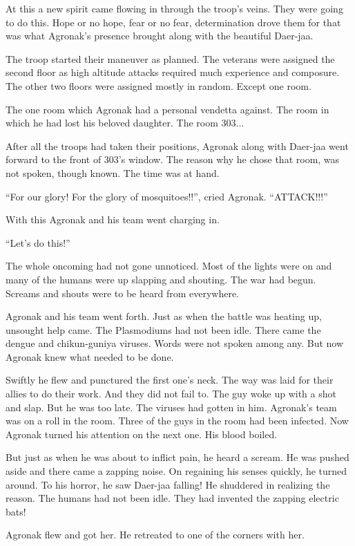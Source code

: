 \documentclass[twoside,11pt,titlepage]{article}
\begin{document}
At this a new spirit came flowing in through the troop's veins. They were going to do this. Hope or no hope, fear or no fear, determination drove them for that was what Agronak's presence brought along with the beautiful Daer-jaa.

The troop started their maneuver as planned. The veterans were assigned the second floor as high altitude attacks required much experience and composure. The other two floors were assigned mostly in random. Except one room.

The one room which Agronak had a personal vendetta against. The room in which he had lost his beloved daughter. The room 303...

After all the troops had taken their positions, Agronak along with Daer-jaa went forward to the front of 303's window. The reason why he chose that room, was not spoken, though known. The time was at hand.

``For our glory! For the glory of mosquitoes!!'', cried Agronak. ``ATTACK!!!''

With this Agronak and his team went charging in.

``Let’s do this!''

The whole oncoming had not gone unnoticed. Most of the lights were on and many of the humans were up slapping and shouting. The war had begun. Screams and shouts were to be heard from everywhere.

Agronak and his team went forth. Just as when the battle was heating up, unsought help came. The Plasmodiums had not been idle. There came the dengue and chikun-guniya viruses. Words were not spoken among any. But now Agronak knew what needed to be done.

Swiftly he flew and punctured the first one's neck. The way was laid for their allies to do their work. And they did not fail to. The guy woke up with a shot and slap. But he was too late. The viruses had gotten in him. Agronak's team was on a roll in the room. Three of the guys in the room had been infected. Now Agronak turned his attention on the next one. His blood boiled.

But just as when he was about to inflict pain, he heard a scream. He was pushed aside and there came a zapping noise. On regaining his senses quickly, he turned around. To his horror, he saw Daer-jaa falling! He shuddered in realizing the reason. The humans had not been idle. They had invented the zapping electric bats!

Agronak flew and got her. He retreated to one of the corners with her.
\end{document}
